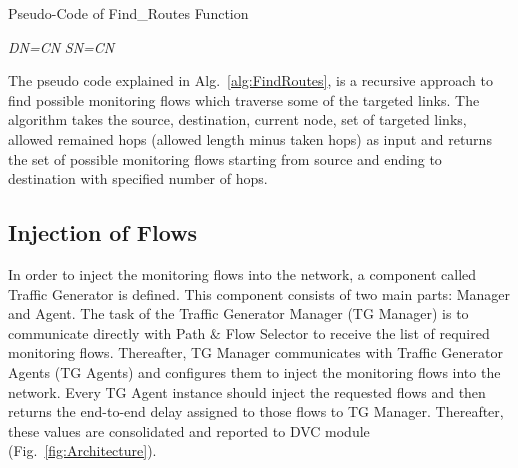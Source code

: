 \documentclass[10pt, journal, letterpaper]{IEEEtran}
\begin{document}
\begin{algorithm}[!htbp]
	\caption{Pseudo-Code of Find\_Routes Function}
	\label{alg:FindRoutes}
	\small
	\allowdisplaybreaks
	\begin{algorithmic}[1]
    	\OUTPUT{$<>$}
    	    \EndIf
    	\Else
    	     \textit{DN=CN} \EndIf
    	     \textit{SN=CN} \EndIf
    	        \EndIf
    	    \EndFor
    	\EndIf
	\end{algorithmic}
\end{algorithm}

The pseudo code explained in Alg.~\ref{alg:FindRoutes}, is a recursive approach to find possible monitoring flows which traverse some of the targeted links. The algorithm takes the source, destination, current node, set of targeted links, allowed remained hops (allowed length minus taken hops) as input and returns the set of possible monitoring flows starting from source and ending to destination with specified number of hops.

\subsection{Injection of Flows}
In order to inject the monitoring flows into the network, a component called Traffic Generator is defined. This component consists of two main parts: Manager and Agent. The task of the Traffic Generator Manager (TG Manager) is to communicate directly with Path $\&$ Flow Selector to receive the list of required monitoring flows. Thereafter, TG Manager communicates with Traffic Generator Agents (TG Agents) and configures them to inject the monitoring flows into the network. Every TG Agent instance should inject the requested flows and then returns the end-to-end delay assigned to those flows to TG Manager. Thereafter, these values are consolidated and reported to DVC module (Fig.~\ref{fig:Architecture}). 
\end{document}
